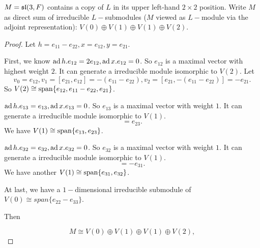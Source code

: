 \begin{ex}
  $M = \sl(3,F)$ contains a copy of $L$ in its upper left-hand $2 \times 2$ position. Write $M$ as direct sum of irreducible $L-$submodules ($M$ viewed as $L-$module via the adjoint representation): $V(0)\oplus V(1) \oplus V(1) \oplus V(2)$.
\end{ex}
\begin{proof}
  Let $h = e_{11} - e_{22}, x = e_{12}, y = e_{21}$.

  First, we know $\ad h.e_{12} = 2e_{12}, \ad x.e_{12} = 0$. So $e_{12}$ is a maximal vector with highest weight $2$. It can generate a irreducible module isomorphic to $V(2)$.
  Let
  \begin{equation*}
    v_0 = e_{12}, v_1 = [e_{21}, e_{12}] = -(e_{11} - e_{22}), v_2 = [e_{21},-(e_{11} - e_{22})] = -e_{21}.
  \end{equation*}
  So $V(2) \cong \Span\{e_{12}, e_{11} - e_{22}, e_{21}\}$.

  $\ad h.e_{13} = e_{13}, \ad x.e_{13} = 0$. So $e_{13}$ is a maximal vector with weight $1$. It can generate a irreducible module isomorphic to $V(1)$.
  \begin{equation*}
    [e_{21}, e_{13}] = e_{23}.
  \end{equation*}
  We have $V(1) \cong \Span\{e_{13}, e_{23}\}$.

  $\ad h.e_{32} = e_{32}, \ad x.e_{32} = 0$. So $e_{32}$ is a maximal vector with weight $1$. It can generate a irreducible module isomorphic to $V(1)$.
  \begin{equation*}
    [e_{21}, e_{32}] = -e_{31}.
  \end{equation*}
  We have another $V(1) \cong \Span\{e_{31}, e_{32}\}$.

  At last, we have a $1-$dimensional irreducible submodule of $V(0) \cong span\{e_{22} - e_{33}\}$.

  Then

  \begin{equation*}
    M\cong V(0)\oplus V(1) \oplus V(1) \oplus V(2)
, \end{equation*}
\end{proof}

